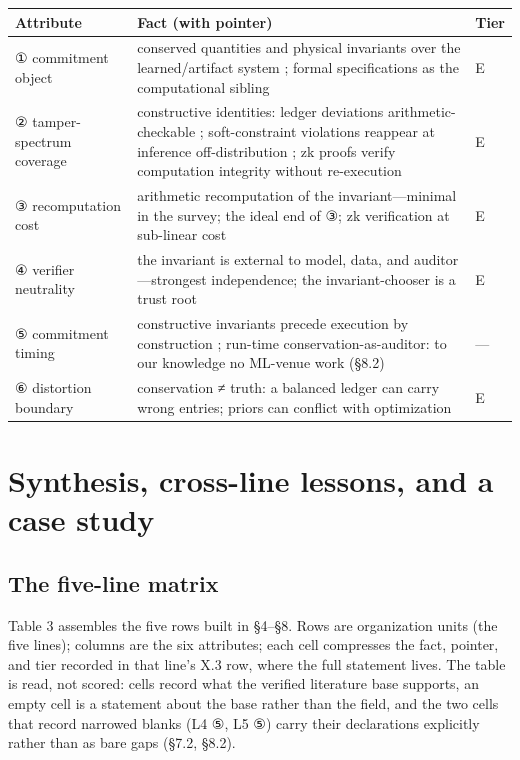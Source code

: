 \documentclass[11pt,a4paper]{article}
\begin{document}
\begin{table}[htbp]
\centering
\footnotesize
\setlength{\tabcolsep}{3.5pt}
\renewcommand{\arraystretch}{1.18}
\begin{tabularx}{0.985\textwidth}{>{\raggedright\arraybackslash}p{} >{\raggedright\arraybackslash}X >{\raggedright\arraybackslash}p{}}
\toprule
\textbf{Attribute} & \textbf{Fact (with pointer)} & \textbf{Tier} \\
\midrule
① commitment object & conserved quantities and physical invariants over the learned\slash artifact system \cite{key11,key12,key13}; formal specifications as the computational sibling \cite{key46,key47,key48} & E \\
② tamper-spectrum coverage & constructive identities: ledger deviations arithmetic-checkable \cite{key11}; soft-constraint violations reappear at inference off-distribution \cite{key12,key13}; zk proofs verify computation integrity without re-execution \cite{key47} & E \\
③ recomputation cost & arithmetic recomputation of the invariant—minimal in the survey; the ideal end of ③; zk verification at sub-linear cost \cite{key47} & E \\
④ verifier neutrality & the invariant is external to model, data, and auditor—strongest independence; the invariant-chooser is a trust root \cite{key11,key12,key13} & E \\
⑤ commitment timing & constructive invariants precede execution by construction \cite{key11}; run-time conservation-as-auditor: to our knowledge no ML-venue work (§8.2) & — \\
⑥ distortion boundary & conservation ≠ truth: a balanced ledger can carry wrong entries; priors can conflict with optimization \cite{key13} & E \\
\bottomrule
\end{tabularx}
\end{table}

\section{Synthesis, cross-line lessons, and a case study}

\subsection{The five-line matrix}

Table 3 assembles the five rows built in §4–§8. Rows are organization units (the five lines); columns are the six attributes; each cell compresses the fact, pointer, and tier recorded in that line's X.3 row, where the full statement lives. The table is read, not scored: cells record what the verified literature base supports, an empty cell is a statement about the base rather than the field, and the two cells that record narrowed blanks (L4 ⑤, L5 ⑤) carry their declarations explicitly rather than as bare gaps (§7.2, §8.2).
\end{document}
